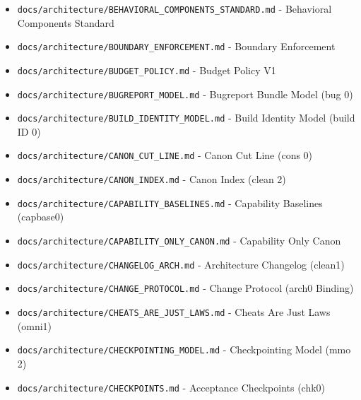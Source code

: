 \documentclass[10.5pt,a4paper,openany]{book}
\begin{document}
\begin{itemize}
\item \texttt{docs/\allowbreak{}architecture/\allowbreak{}BEHAVIORAL\_\allowbreak{}COMPONENTS\_\allowbreak{}STANDARD.\allowbreak{}md} -\allowbreak{} Behavioral Components Standard
\item \texttt{docs/\allowbreak{}architecture/\allowbreak{}BOUNDARY\_\allowbreak{}ENFORCEMENT.\allowbreak{}md} -\allowbreak{} Boundary Enforcement
\item \texttt{docs/\allowbreak{}architecture/\allowbreak{}BUDGET\_\allowbreak{}POLICY.\allowbreak{}md} -\allowbreak{} Budget Policy V1
\item \texttt{docs/\allowbreak{}architecture/\allowbreak{}BUGREPORT\_\allowbreak{}MODEL.\allowbreak{}md} -\allowbreak{} Bugreport Bundle Model (bug 0)
\item \texttt{docs/\allowbreak{}architecture/\allowbreak{}BUILD\_\allowbreak{}IDENTITY\_\allowbreak{}MODEL.\allowbreak{}md} -\allowbreak{} Build Identity Model (build ID 0)
\item \texttt{docs/\allowbreak{}architecture/\allowbreak{}CANON\_\allowbreak{}CUT\_\allowbreak{}LINE.\allowbreak{}md} -\allowbreak{} Canon Cut Line (cons 0)
\item \texttt{docs/\allowbreak{}architecture/\allowbreak{}CANON\_\allowbreak{}INDEX.\allowbreak{}md} -\allowbreak{} Canon Index (clean 2)
\item \texttt{docs/\allowbreak{}architecture/\allowbreak{}CAPABILITY\_\allowbreak{}BASELINES.\allowbreak{}md} -\allowbreak{} Capability Baselines (capbase0)
\item \texttt{docs/\allowbreak{}architecture/\allowbreak{}CAPABILITY\_\allowbreak{}ONLY\_\allowbreak{}CANON.\allowbreak{}md} -\allowbreak{} Capability Only Canon
\item \texttt{docs/\allowbreak{}architecture/\allowbreak{}CHANGELOG\_\allowbreak{}ARCH.\allowbreak{}md} -\allowbreak{} Architecture Changelog (clean1)
\item \texttt{docs/\allowbreak{}architecture/\allowbreak{}CHANGE\_\allowbreak{}PROTOCOL.\allowbreak{}md} -\allowbreak{} Change Protocol (arch0 Binding)
\item \texttt{docs/\allowbreak{}architecture/\allowbreak{}CHEATS\_\allowbreak{}ARE\_\allowbreak{}JUST\_\allowbreak{}LAWS.\allowbreak{}md} -\allowbreak{} Cheats Are Just Laws (omni1)
\item \texttt{docs/\allowbreak{}architecture/\allowbreak{}CHECKPOINTING\_\allowbreak{}MODEL.\allowbreak{}md} -\allowbreak{} Checkpointing Model (mmo 2)
\item \texttt{docs/\allowbreak{}architecture/\allowbreak{}CHECKPOINTS.\allowbreak{}md} -\allowbreak{} Acceptance Checkpoints (chk0)

\end{itemize}
\end{document}
